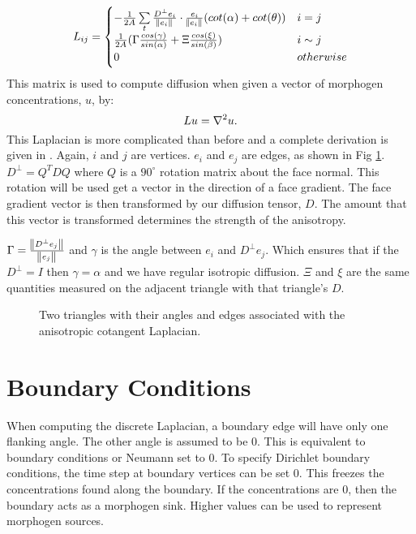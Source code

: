 \[ 
   L_{ij} =
   \begin{cases} 
      -\frac{1}{2A}\sum\limits_{t} \frac{D^\perp e_i}{\norm{e_i}} \cdot \frac{e_i}{\norm{e_i}}(cot(\alpha)+cot(\theta))  & i = j \\
      \frac{1}{2A}(\Gamma \frac{cos(\gamma)}{sin(\alpha)} + \Xi\frac{cos(\xi)}{sin(\beta)})   & i \sim j \\
      0 & otherwise
   \end{cases}
\]
This matrix is used to compute diffusion when given a vector of morphogen concentrations, $u$, by:
\[
	Lu = \nabla^2 u.
\]
This Laplacian is more complicated than before and a complete derivation is given in \citep{AndreuxMathieu2014}. Again, $i$ and $j$ are vertices. $e_i$ and $e_j$ are edges, as shown in Fig \ref{fig:meshLaplacian}. $D^\perp = Q^T D Q$ where $Q$ is a $90^\circ$ rotation matrix about the face normal. This rotation will be used get a vector in the direction of a face gradient. The face gradient vector is then transformed by our diffusion tensor, $D$. The amount that this vector is transformed determines the strength of the anisotropy. 

$\Gamma = \frac{\norm{D^\perp e_j}}{\norm{e_j}}$ and $\gamma$ is the angle between $e_i$ and $D^\perp e_j$. Which ensures that if the $D^{\perp} = I$ then $\gamma = \alpha$ and we have regular isotropic diffusion. $\Xi$ and $\xi$ are the same quantities measured on the adjacent triangle with that triangle's $D$. 

\begin{figure}[H]
	\centering
	\caption{Two triangles with their angles and edges associated with the anisotropic cotangent Laplacian.}
	\label{fig:meshLaplacian}
\end{figure}

\section{Boundary Conditions}
When computing the discrete Laplacian, a boundary edge will have only one flanking angle. The other angle is assumed to be 0. This is equivalent to  boundary conditions or Neumann set to 0. To specify Dirichlet boundary conditions, the time step at boundary vertices can be set 0. This freezes the concentrations found along the boundary. If the concentrations are 0, then the boundary acts as a morphogen sink. Higher values can be used to represent morphogen sources.


